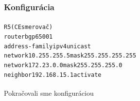 \documentclass[12pt,twoside,a4paper]{report}
\begin{document}
\subsubsection{Konfigurácia}
\paragraph{}

\noindent
{\selectfont
\begin{small}
\begin{alltt}
R5 (CE smerovač)
router bgp 65001
  address-family ipv4 unicast
    network 10.255.255.5 mask 255.255.255.255
    network 172.23.0.0 mask 255.255.255.0
    neighbor 192.168.15.1 activate
\end{alltt}
\end{small}
}

\paragraph{}
Pokračovali sme konfiguráciou 
\end{document}
